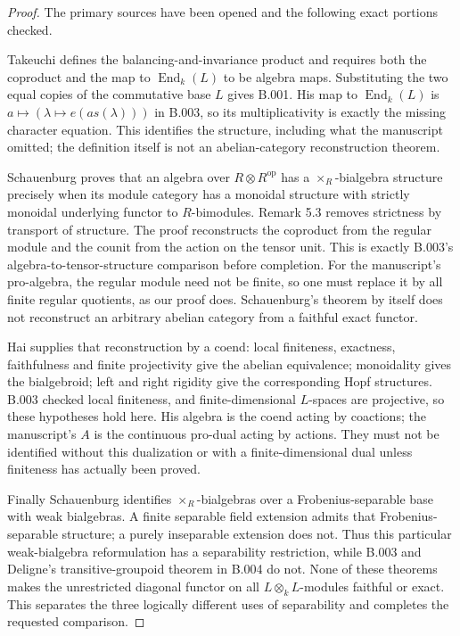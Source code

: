 \begin{proof}
The primary sources have been opened and the following exact portions
checked.

Takeuchi \cite[\S1, especially 1.1--1.2; Definition 4.5, pp.474--475]
{Takeuchi1977} defines the balancing-and-invariance product and requires
both the coproduct and the map to $\operatorname{End}_k(L)$ to be
algebra maps. Substituting the two equal copies of the commutative base
$L$ gives B.001. His map to $\operatorname{End}_k(L)$ is
$a\mapsto(\lambda\mapsto e(a s(\lambda)))$ in B.003, so its
multiplicativity is exactly the missing character equation. This identifies
the structure, including what the manuscript omitted; the definition
itself is not an abelian-category reconstruction theorem.

Schauenburg \cite[Theorem 5.1 and Remark 5.3; author's preprint pp.15--17]
{Schauenburg1998} proves that an algebra over $R\otimes R^{\mathrm{op}}$
has a $\times_R$-bialgebra structure precisely when its module category
has a monoidal structure with strictly monoidal underlying functor to
$R$-bimodules. Remark 5.3 removes strictness by transport of structure.
The proof reconstructs the coproduct from the regular module and the
counit from the action on the tensor unit. This is exactly B.003's
algebra-to-tensor-structure comparison before completion. For the
manuscript's pro-algebra, the regular module need not be finite, so one
must replace it by all finite regular quotients, as our proof does.
Schauenburg's theorem by itself does not reconstruct an arbitrary abelian
category from a faithful exact functor.

Hai \cite[Theorem 2.1.2, Theorem 2.2.4, Corollary 2.2.5, and
Theorem 2.2.6]{Hai2008} supplies that reconstruction by a coend: local
finiteness, exactness, faithfulness and finite projectivity give the
abelian equivalence; monoidality gives the bialgebroid; left and right
rigidity give the corresponding Hopf structures. B.003 checked local
finiteness, and finite-dimensional $L$-spaces are projective, so these
hypotheses hold here. His algebra is the coend acting by coactions;
the manuscript's $A$ is the continuous pro-dual acting by actions.
They must not be identified without this dualization or with a
finite-dimensional dual unless finiteness has actually been proved.

Finally Schauenburg \cite[\S3 and Theorems 5.1, 5.5]{Schauenburg2003}
identifies $\times_R$-bialgebras over a Frobenius-separable base with
weak bialgebras. A finite separable field extension admits that
Frobenius-separable structure; a purely inseparable extension does not.
Thus this particular weak-bialgebra reformulation has a separability
restriction, while B.003 and Deligne's transitive-groupoid theorem in
B.004 do not. None of these theorems makes the unrestricted diagonal
functor on all $L\otimes_kL$-modules faithful or exact. This separates
the three logically different uses of separability and completes the
requested comparison.
\end{proof}

